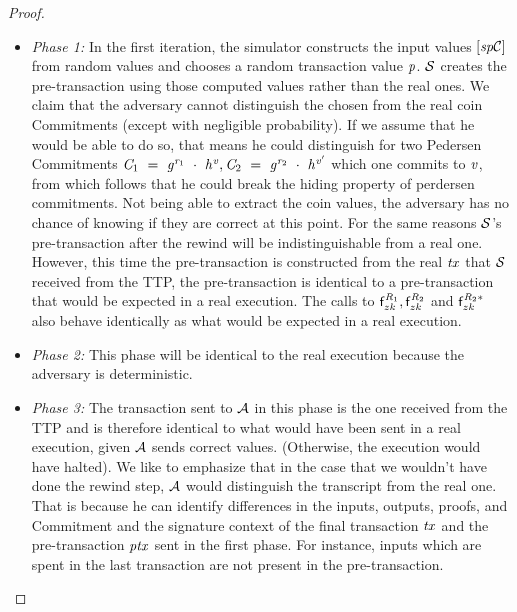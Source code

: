 \begin{proof}
    \begin{itemize}
        \item \textit{Phase 1:} In the first iteration, the simulator constructs the input values $[\mathit{sp}\mathcal{C}]$ from random values and chooses a random transaction value $\mathit{p}$.
        $\mathcal{S}$ creates the pre-transaction using those computed values rather than the real ones.
        We claim that the adversary cannot distinguish the chosen from the real coin Commitments (except with negligible probability).
        If we assume that he would be able to do so, that means he could distinguish for two Pedersen Commitments $\mathit{C}_1 ~=~ \mathit{g}^{\mathit{r}_1} ~\cdot~ \mathit{h}^{\mathit{v}}, \mathit{C}_2 ~=~ \mathit{g}^{\mathit{r}_2} ~\cdot~ \mathit{h}^{{\mathit{v}}'}$ which one commits to $\mathit{v}$, from which follows that he could break the hiding property of perdersen commitments.
        Not being able to extract the coin values, the adversary has no chance of knowing if they are correct at this point.
        For the same reasons $\mathcal{S}$'s pre-transaction after the rewind will be indistinguishable from a real one.
        However, this time the pre-transaction is constructed from the real $\mathit{tx}$ that $\mathcal{S}$ received from the TTP, the pre-transaction is identical to a pre-transaction that would be expected in a real execution.
        The calls to $\mathsf{f}^{\mathit{R}_1}_{zk}, \mathsf{f}^{\mathit{R}_2}_{zk}$ and $\mathsf{f}^{\mathit{R}_2*}_{zk}$ also behave identically as what would be expected in a real execution.
        \item \textit{Phase 2:} This phase will be identical to the real execution because the adversary is deterministic.
        \item \textit{Phase 3:} The transaction sent to $\mathcal{A}$ in this phase is the one received from the TTP and is therefore identical to what would have been sent in a real execution, given $\mathcal{A}$ sends correct values. (Otherwise, the execution would have halted).
        We like to emphasize that in the case that we wouldn't have done the rewind step, $\mathcal{A}$ would distinguish the transcript from the real one.
        That is because he can identify differences in the inputs, outputs, proofs, and Commitment and the signature context of the final transaction $\mathit{tx}$ and the pre-transaction $\mathit{ptx}$ sent in the first phase.
        For instance, inputs which are spent in the last transaction are not present in the pre-transaction.

\end{itemize}
\end{proof}
